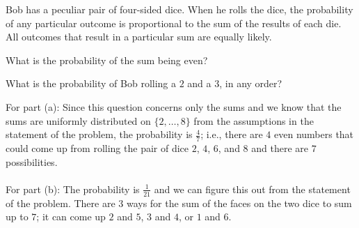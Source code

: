 \begin{problem}
  Bob has a peculiar pair of four-sided dice. When he rolls the dice, the
  probability of any particular outcome is proportional to the sum of the
  results of each die. All outcomes that result in a particular sum are
  equally likely.
  \begin{alphlist}
  \item What is the probability of the sum being even?
  \item What is the probability of Bob rolling a \(2\) and a \(3\), in any
    order?
  \end{alphlist}
\end{problem}
\begin{solution*}
  For part (a): Since this question concerns only the sums and we know that
  the sums are uniformly distributed on \(\{2,\dotsc,8\}\) from the
  assumptions in the statement of the problem, the probability is
  \(\frac{4}{7}\); i.e., there are \(4\) even numbers that could come up
  from rolling the pair of dice \(2\), \(4\), \(6\), and \(8\) and there
  are \(7\) possibilities.
  \\\\
  For part (b): The probability is \(\frac{1}{21}\) and we can figure this
  out from the statement of the problem. There are \(3\) ways for the sum
  of the faces on the two dice to sum up to \(7\); it can come up \(2\) and
  \(5\), \(3\) and \(4\), or \(1\) and \(6\).
\end{solution*}

